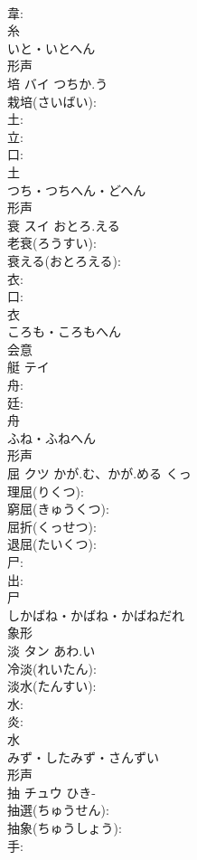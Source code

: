 \documentclass[8pt]{extreport}
\begin{document}
\begin{CJK}{UTF8}{min}
\\	韋: 
\\	糸	
\\	いと・いとへん	
\\	形声 
\\	培	バイ	つちか.う		
\\	栽培(さいばい): 
\\	土: 
\\	立: 
\\	口: 
\\	土	
\\	つち・つちへん・どへん	
\\	形声 
\\	衰	スイ	おとろ.える		
\\	老衰(ろうすい): 
\\	衰える(おとろえる): 
\\	衣: 
\\	口: 
\\	衣	
\\	ころも・ころもへん	
\\	会意 
\\	艇	テイ			
\\	舟: 
\\	廷: 
\\	舟	
\\	ふね・ふねへん	
\\	形声 
\\	屈	クツ	かが.む、かが.める	くっ	
\\	理屈(りくつ): 
\\	窮屈(きゅうくつ): 
\\	屈折(くっせつ): 
\\	退屈(たいくつ): 
\\	尸: 
\\	出: 
\\	尸	
\\	しかばね・かばね・かばねだれ	
\\	象形 
\\	淡	タン	あわ.い		
\\	冷淡(れいたん): 
\\	淡水(たんすい): 
\\	水: 
\\	炎: 
\\	水	
\\	みず・したみず・さんずい	
\\	形声 
\\	抽	チュウ	ひき-		
\\	抽選(ちゅうせん): 
\\	抽象(ちゅうしょう): 
\\	手: 

\end{CJK}
\end{document}
